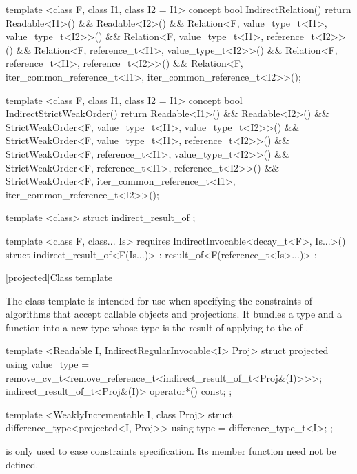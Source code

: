 \begin{codeblock}
  template <class F, class I1, class I2 = I1>
  concept bool IndirectRelation() {
    return Readable<I1>() && Readable<I2>() &&
      Relation<F, value_type_t<I1>, value_type_t<I2>>() &&
      Relation<F, value_type_t<I1>, reference_t<I2>>() &&
      Relation<F, reference_t<I1>, value_type_t<I2>>() &&
      Relation<F, reference_t<I1>, reference_t<I2>>() &&
      Relation<F, iter_common_reference_t<I1>, iter_common_reference_t<I2>>();
  }

  template <class F, class I1, class I2 = I1>
  concept bool IndirectStrictWeakOrder() {
    return Readable<I1>() && Readable<I2>() &&
      StrictWeakOrder<F, value_type_t<I1>, value_type_t<I2>>() &&
      StrictWeakOrder<F, value_type_t<I1>, reference_t<I2>>() &&
      StrictWeakOrder<F, reference_t<I1>, value_type_t<I2>>() &&
      StrictWeakOrder<F, reference_t<I1>, reference_t<I2>>() &&
      StrictWeakOrder<F, iter_common_reference_t<I1>, iter_common_reference_t<I2>>();
  }

  template <class> struct indirect_result_of { };

  template <class F, class... Is>
    requires IndirectInvocable<decay_t<F>, Is...>()
  struct indirect_result_of<F(Is...)> :
    result_of<F(reference_t<Is>...)> { };
\end{codeblock}

[projected]{Class template }

\pnum
The  class template is intended for use when specifying the constraints of
algorithms that accept callable objects and projections. It bundles a  type
 and a function  into a new  type whose
 type is the result of applying  to the
 of .

%
\begin{codeblock}
  template <Readable I, IndirectRegularInvocable<I> Proj>
  struct projected {
    using value_type = remove_cv_t<remove_reference_t<indirect_result_of_t<Proj&(I)>>>;
    indirect_result_of_t<Proj&(I)> operator*() const;
  };

  template <WeaklyIncrementable I, class Proj>
  struct difference_type<projected<I, Proj>> {
    using type = difference_type_t<I>;
  };
\end{codeblock}

\pnum
\enternote {} is only used to ease constraints specification. Its
member function need not be defined.\exitnote

